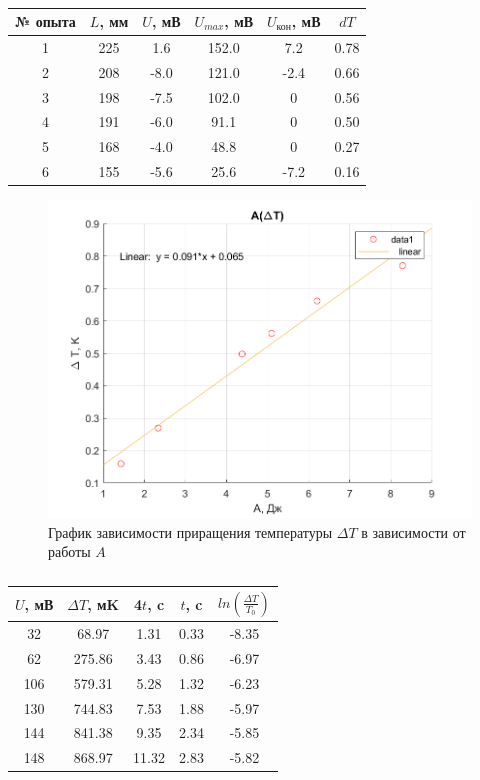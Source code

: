 \documentclass[a4paper,11.5pt]{article} %
\begin{document}
\begin{table}[H]
\begin{center} 
\begin{tabular}{|c|c|c|c|c|c|}
\hline 
№ опыта & $L$, мм & $U$, мВ & $U_{max}$, мВ & $U_{\text{кон}}$, мВ & $dT$ \\
\hline 
1 & 225 & 1.6 & 152.0 & 7.2 & 0.78 \\ 
\hline 
2 & 208 & -8.0 & 121.0 & -2.4 & 0.66\\ 
\hline 
3 & 198 & -7.5 & 102.0 & 0 & 0.56 \\ 
\hline 
4 & 191 & -6.0 & 91.1 & 0 & 0.50 \\ 
\hline
5 & 168 & -4.0 & 48.8 & 0 & 0.27 \\ 
\hline 
6 & 155 & -5.6 & 25.6 & -7.2 & 0.16 \\ 
\hline  
\end{tabular}
\caption{\label{tab:2}}
\end{center}
\end{table}


\begin{figure}[h]
    \centering
    \includegraphics[scale=0.58]{graph2.png}
    \caption{График зависимости приращения температуры $\Delta T $ в зависимости от работы $A$}
    \label{fig:vac22}
\end{figure}

\begin{table}[H]
\begin{center} 
\begin{tabular}{|c|c|c|c|c|}
\hline 
$U$, мВ & $\Delta T$, мK & 4$t$, c & $t$, c & $ln(\frac{\Delta T}{T_0})$ \\
\hline 
32 & 68.97 & 1.31 & 0.33 & -8.35 \\  
\hline 
62 & 275.86 & 3.43 & 0.86 & -6.97 \\ 
\hline 
106 & 579.31 & 5.28 & 1.32 & -6.23 \\ 
\hline 
130 & 744.83 & 7.53 & 1.88 & -5.97 \\ 
\hline 
144 & 841.38 & 9.35 & 2.34 & -5.85 \\ 
\hline 
148 & 868.97 & 11.32 & 2.83 & -5.82 \\ 
\hline 
\end{tabular} 
\caption{\label{tab:3}}
\end{center}
\end{table}
\end{document}
